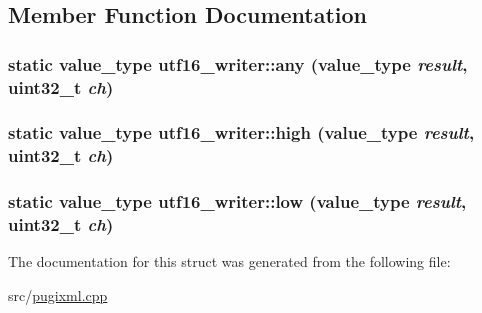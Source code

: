 \subsection{Member Function Documentation}
\hypertarget{structutf16__writer_ac14e06db126fbbef4be7efdb80fbdf4a}{
\subsubsection[{any}]{\setlength{\rightskip}{0pt plus 5cm}static {\bf value\_\-type} utf16\_\-writer::any ({\bf value\_\-type} {\em result}, \/  uint32\_\-t {\em ch})}}
\label{structutf16__writer_ac14e06db126fbbef4be7efdb80fbdf4a}
\hypertarget{structutf16__writer_a01b6ce1a567dea11daead3ca83f42d5c}{
\subsubsection[{high}]{\setlength{\rightskip}{0pt plus 5cm}static {\bf value\_\-type} utf16\_\-writer::high ({\bf value\_\-type} {\em result}, \/  uint32\_\-t {\em ch})}}
\label{structutf16__writer_a01b6ce1a567dea11daead3ca83f42d5c}
\hypertarget{structutf16__writer_ab11fef721a8b38de5e315d2e75d12956}{
\subsubsection[{low}]{\setlength{\rightskip}{0pt plus 5cm}static {\bf value\_\-type} utf16\_\-writer::low ({\bf value\_\-type} {\em result}, \/  uint32\_\-t {\em ch})}}
\label{structutf16__writer_ab11fef721a8b38de5e315d2e75d12956}


The documentation for this struct was generated from the following file:\begin{DoxyCompactItemize}
\item 
src/\hyperlink{pugixml_8cpp}{pugixml.cpp}\end{DoxyCompactItemize}
